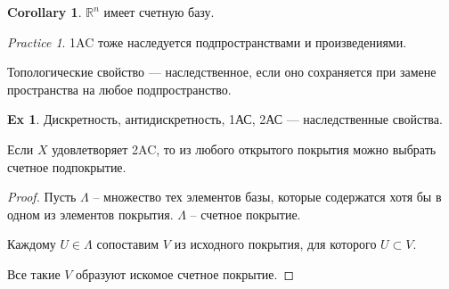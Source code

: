 \documentclass[11pt]{book}
\newcommand{\R}{\mathbb{R}}
\theoremstyle{definition}
\theoremstyle{plain}
\theoremstyle{plain}
\theoremstyle{definition}
\newtheorem*{ex}{Ex}
\newtheorem*{cor}{Corollary}
\theoremstyle{remark}
\newtheorem*{prac}{Practice}
\begin{document}
\begin{cor}
    $ \R^{n}$ имеет счетную базу.
\end{cor}
\begin{prac}
    1AC тоже наследуется подпространствами и произведениями.
\end{prac}
\begin{defn}
    {\sf Топологические свойство} --- наследственное, если оно сохраняется при замене пространства на любое подпространство.
\end{defn}
\begin{ex}
    Дискретность, антидискретность, 1АС, 2АС --- наследственные свойства.
\end{ex}
\begin{thm}[Линделёф]
    Если $ X$ удовлетворяет 2AC, то из любого открытого покрытия можно выбрать счетное подпокрытие.
\end{thm}
\begin{proof}
    Пусть  $ \Lambda $ -- множество тех элементов базы, которые содержатся хотя бы в одном из элементов покрытия. $ \Lambda$ -- счетное покрытие.

    Каждому $ U \in \Lambda$ сопоставим $ V$ из исходного покрытия, для которого  $ U \subset V$.

    Все такие $ V$ образуют искомое счетное покрытие.
\end{proof}
\end{document}
